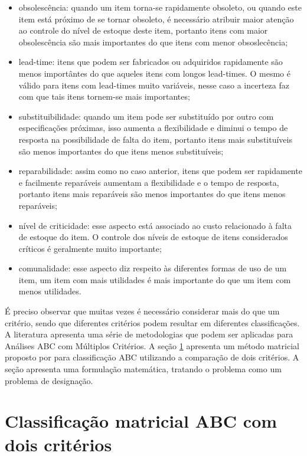\documentclass{book}
\begin{document}
\begin{itemize}
\item obsolescência: quando um item torna-se rapidamente obsoleto, ou quando este item está próximo de se tornar obsoleto, é necessário atribuir maior atenção ao controle do nível de estoque deste item, portanto itens com maior obsolescência são mais importantes do que itens com menor obsoslecência;
\item lead-time: itens que podem ser fabricados ou adquiridos rapidamente são menos importântes do que aqueles itens com longos lead-times. O mesmo é válido para itens com lead-times muito variáveis, nesse caso a incerteza faz com que tais itens tornem-se mais importantes;
\item substituibilidade: quando um item pode ser substituído por outro com especificações próximas, isso aumenta a flexibilidade e diminui o tempo de resposta na possibilidade de falta do item, portanto itens mais substituíveis são menos importantes do que itens menos substituíveis;
\item reparabilidade: assim como no caso anterior, itens que podem ser rapidamente e facilmente reparáveis aumentam a flexibilidade e o tempo de resposta, portanto itens mais reparáveis são menos importantes do que itens menos reparáveis;
\item nível de criticidade: esse aspecto está associado ao custo relacionado à falta de estoque do item. O controle dos níveis de estoque de itens considerados críticos é geralmente muito importante;
\item comunalidade: esse aspecto diz respeito às diferentes formas de uso de um item, um item com mais utilidades é mais importante do que um item com menos utilidades.
\end{itemize}

É preciso observar que muitas vezes é necessário considerar mais do que um critério, sendo que diferentes critérios podem resultar em diferentes classificações. A literatura apresenta uma série de metodologias que podem ser aplicadas para Análises ABC com Múltiplos Critérios. A seção \ref{biCriteriaABC} apresenta um método matricial proposto por \cite{FloresWhybark1985} para classificação ABC utilizando a comparação de dois critérios. A seção apresenta uma formulação matemática, tratando o problema como um problema de designação.

\section{Classificação matricial ABC com dois critérios}
\label{biCriteriaABC}
\end{document}
